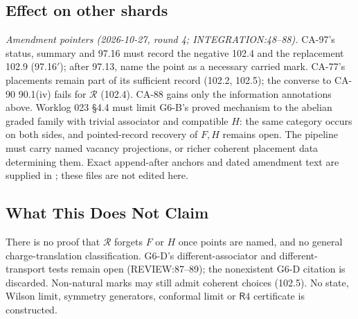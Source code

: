 \subsection{Effect on other shards}
\emph{Amendment pointers (2026-10-27, round 4; INTEGRATION:48--88).} CA-97's status, summary and
97.16 must record the negative 102.4 and the replacement 102.9 (97.16\('\)); after 97.13, name the point as
a necessary carried mark. CA-77's placements remain part of its sufficient record (102.2, 102.5);
the converse to CA-90 90.1(iv) fails for \(\mathcal R\) (102.4). CA-88 gains only the information annotations above.
Worklog 023 \S4.4 must limit G6-B's proved mechanism to the abelian graded family with trivial associator
and compatible \(H\): the same category occurs on both sides, and pointed-record recovery of \(F,H\) remains open.
The pipeline must carry named vacancy projections, or richer coherent placement data determining them.
Exact append-after anchors and dated amendment text are supplied in ; these files are not edited here.

\subsection{What This Does Not Claim}
There is no proof that \(\mathcal R\) forgets \(F\) or \(H\) once points are named, and no general charge-translation
classification. G6-D's different-associator and different-transport tests remain open (REVIEW:87--89);
the nonexistent G6-D citation is discarded. Non-natural marks may still admit coherent choices (102.5).
No state, Wilson limit, symmetry generators, conformal limit or \(\mathsf R4\) certificate is constructed.

